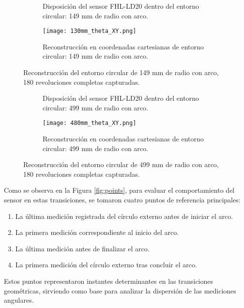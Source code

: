 \begin{figure}[H]
	\centering
	\begin{subfigure}{0.45\textwidth}
		\centering
		\caption{Disposición del sensor FHL-LD20 dentro del entorno circular: 149 mm de radio con arco.}
		\label{fig:disposicion_lidar_theta1}
	\end{subfigure}
	\hspace{1em}
	\begin{subfigure}{0.45\textwidth}
		\centering
		\texttt{[image: 130mm\_theta\_XY.png]}
		\caption{Reconstrucción en coordenadas cartesianas de entorno circular: 149 mm de radio con arco.}
		\label{fig:149m_radius_xy_theta1}
	\end{subfigure}
	\caption{Reconstrucción del entorno circular de 149 mm de radio con arco, 180 revoluciones completas capturadas.}
	\label{fig:disposicion_lidar_var_theta1}
\end{figure}

\begin{figure}[H]
	\centering
	\begin{subfigure}{0.45\textwidth}
		\centering
		\caption{Disposición del sensor FHL-LD20 dentro del entorno circular: 499 mm de radio con arco.}
		\label{fig:disposicion_lidar_theta8}
	\end{subfigure}
	\hspace{1em}
	\begin{subfigure}{0.45\textwidth}
		\centering
		\texttt{[image: 480mm\_theta\_XY.png]}
		\caption{Reconstrucción en coordenadas cartesianas de entorno circular: 499 mm de radio con arco.}
		\label{fig:499m_radius_xy_theta8}
	\end{subfigure}
	\caption{Reconstrucción del entorno circular de 499 mm de radio con arco, 180 revoluciones completas capturadas.}
	\label{fig:disposicion_lidar_var_theta8}
\end{figure}

Como se observa en la Figura \ref{fig:points}, para evaluar el comportamiento del sensor en estas transiciones, se tomaron cuatro puntos de referencia principales: 
\begin{enumerate}
	\item  La última medición registrada del círculo externo antes de iniciar el arco. 
	\item La primera medición correspondiente al inicio del arco.
	\item La última medición antes de finalizar el arco.
	\item La primera medición del círculo externo tras concluir el arco.
\end{enumerate}
Estos puntos representaron instantes determinantes en las transiciones geométricas, sirviendo como base para analizar la dispersión de las mediciones angulares.

